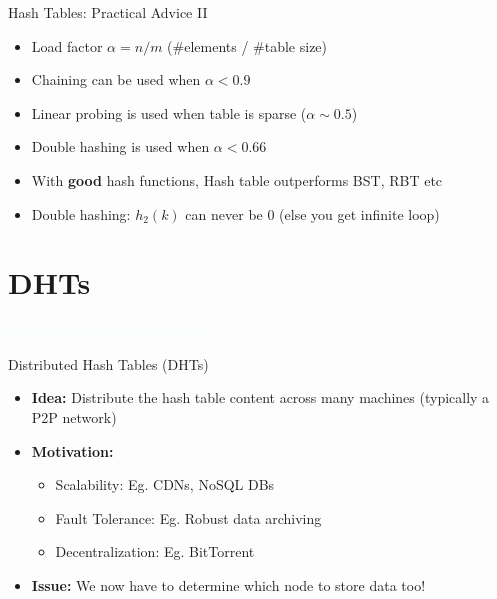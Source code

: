 \documentclass{beamer}
\newcommand{\thblue}[1]{{\Huge {\textcolor{azure}{#1}}}}
\begin{document}
\begin{frame}{Hash Tables: Practical Advice II}
    \begin{itemize}
        \item Load factor $\alpha = n/m$ (\#elements / \#table size)
        \item Chaining can be used when $\alpha < 0.9$
        \item Linear probing is used when table is sparse ($\alpha \sim 0.5$)
        \item Double hashing is used when $\alpha < 0.66$
        \item With {\bf good} hash functions, Hash table outperforms BST, RBT etc
        \item Double hashing: $h_2(k)$ can never be $0$ (else you get infinite loop)
    \end{itemize}
\end{frame}



\section{DHTs}
\begin{frame}{}
    \begin{center}
        \thblue{Distributed Hash Tables (DHTs)}
    \end{center}
\end{frame}

\begin{frame}{Distributed Hash Tables (DHTs)}
    \begin{itemize}
        \item {\bf Idea:} Distribute the hash table content across many machines (typically a P2P network) 
        \item {\bf Motivation:}
        \begin{itemize}
            \item Scalability: Eg. CDNs, NoSQL DBs
            \item Fault Tolerance: Eg. Robust data archiving 
            \item Decentralization: Eg. BitTorrent
        \end{itemize}
        \item {\bf Issue:} We now have to determine which node to store data too!
    \end{itemize}
\end{frame}
\end{document}
